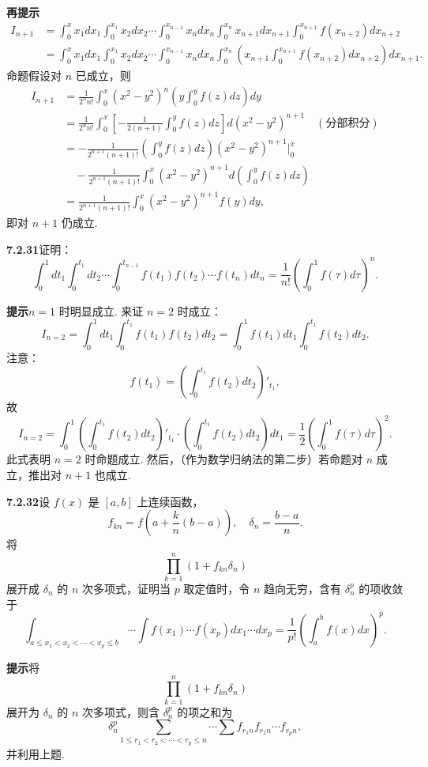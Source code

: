 \documentclass[UTF8,12pt,a4paper,fontset=fandol]{ctexart}
\begin{document}
\noindent\textbf{再提示}\quad
\[
\begin{aligned}
I_{n+1}
&=\int_0^x x_1dx_1\int_0^{x_1}x_2dx_2\cdots
\int_0^{x_{n-1}}x_ndx_n\int_0^{x_n}x_{n+1}dx_{n+1}
\int_0^{x_{n+1}}f(x_{n+2})dx_{n+2}\\
&=\int_0^x x_1dx_1\int_0^{x_1}x_2dx_2\cdots
\int_0^{x_{n-1}}x_ndx_n\int_0^{x_n}
\left(x_{n+1}\int_0^{x_{n+1}}f(x_{n+2})dx_{n+2}\right)dx_{n+1}.
\end{aligned}
\]
命题假设对 $n$ 已成立，则
\[
\begin{aligned}
I_{n+1}
&=\frac1{2^nn!}\int_0^x(x^2-y^2)^n
\left(y\int_0^yf(z)dz\right)dy\\
&=\frac1{2^nn!}\int_0^x
\left[-\frac1{2(n+1)}\int_0^yf(z)dz\right]d(x^2-y^2)^{n+1}
\quad(\text{分部积分})\\
&=-\frac1{2^{n+1}(n+1)!}
\left(\int_0^yf(z)dz\right)(x^2-y^2)^{n+1}\Big|_0^x\\
&\quad-\frac1{2^{n+1}(n+1)!}
\int_0^x(x^2-y^2)^{n+1}d\left(\int_0^yf(z)dz\right)\\
&=\frac1{2^{n+1}(n+1)!}\int_0^x(x^2-y^2)^{n+1}f(y)dy,
\end{aligned}
\]
即对 $n+1$ 仍成立.

\noindent\textbf{7.2.31}\quad 证明：
\[
\int_0^1dt_1\int_0^{t_1}dt_2\cdots\int_0^{t_{n-1}}
f(t_1)f(t_2)\cdots f(t_n)dt_n
=\frac1{n!}\left(\int_0^1f(\tau)d\tau\right)^n.
\]

\noindent\textbf{提示}\quad $n=1$ 时明显成立. 来证 $n=2$ 时成立：
\[
I_{n=2}=\int_0^1dt_1\int_0^{t_1}f(t_1)f(t_2)dt_2
=\int_0^1f(t_1)dt_1\int_0^{t_1}f(t_2)dt_2.
\]
注意：
\[
f(t_1)=\left(\int_0^{t_1}f(t_2)dt_2\right)'_{t_1},
\]
故
\[
I_{n=2}=\int_0^1\left(\int_0^{t_1}f(t_2)dt_2\right)'_{t_1}
\cdot\left(\int_0^{t_1}f(t_2)dt_2\right)dt_1
=\frac12\left(\int_0^1f(\tau)d\tau\right)^2.
\]
此式表明 $n=2$ 时命题成立. 然后，（作为数学归纳法的第二步）若命题对 $n$ 成立，推出对 $n+1$ 也成立.

\noindent\textbf{7.2.32}\quad 设 $f(x)$ 是 $[a,b]$ 上连续函数，
\[
f_{kn}=f\left(a+\frac kn(b-a)\right),\quad
\delta_n=\frac{b-a}{n}.
\]
将
\[
\prod_{k=1}^n(1+f_{kn}\delta_n)
\]
展开成 $\delta_n$ 的 $n$ 次多项式，证明当 $p$ 取定值时，令 $n$ 趋向无穷，含有 $\delta_n^p$ 的项收敛于
\[
\int_{a\le x_1<x_2<\cdots<x_p\le b}\cdots\int
f(x_1)\cdots f(x_p)dx_1\cdots dx_p
=\frac1{p!}\left(\int_a^bf(x)dx\right)^p.
\]

\noindent\textbf{提示}\quad 将
\[
\prod_{k=1}^n(1+f_{kn}\delta_n)
\]
展开为 $\delta_n$ 的 $n$ 次多项式，则含 $\delta_n^p$ 的项之和为
\[
\delta_n^p\sum_{1\le r_1<r_2<\cdots<r_p\le n}\cdots\sum
f_{r_1n}f_{r_2n}\cdots f_{r_pn},
\]
并利用上题.
\end{document}
